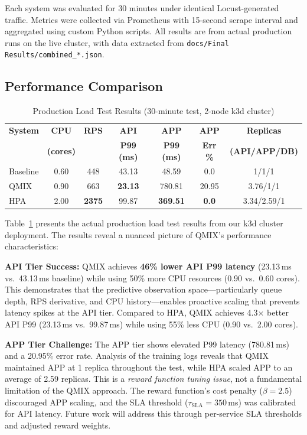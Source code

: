 \documentclass[conference]{IEEEtran}
\begin{document}
Each system was evaluated for 30 minutes under identical
Locust-generated traffic. Metrics were collected via Prometheus with
15-second scrape interval and aggregated using custom Python scripts.
All results are from actual production runs on the live cluster, with
data extracted from \texttt{docs/Final Results/combined\_*.json}.

\subsection{Performance Comparison}

\begin{table}[t]
\centering
\caption{Production Load Test Results (30-minute test, 2-node k3d cluster)}
\label{tab:results}
\setlength{\tabcolsep}{3pt}
\begin{tabular}{lcccccc}
\toprule
\textbf{System} & \textbf{CPU} & \textbf{RPS} & \textbf{API} & \textbf{APP} & \textbf{APP} & \textbf{Replicas} \\
 & \textbf{(cores)} & & \textbf{P99 (ms)} & \textbf{P99 (ms)} & \textbf{Err \%} & \textbf{(API/APP/DB)} \\
\midrule
Baseline & 0.60 & 448 & 43.13 & 48.59 & 0.0 & 1/1/1 \\
QMIX & 0.90 & 663 & \textbf{23.13} & 780.81 & 20.95 & 3.76/1/1 \\
HPA & 2.00 & \textbf{2375} & 99.87 & \textbf{369.51} & \textbf{0.0} & 3.34/2.59/1 \\
\bottomrule
\end{tabular}
\end{table}

Table~\ref{tab:results} presents the actual production load test results
from our k3d cluster deployment. The results reveal a nuanced picture of
QMIX's performance characteristics:

\textbf{API Tier Success:} QMIX achieves \textbf{46\% lower API P99 latency}
(23.13\,ms vs.\ 43.13\,ms baseline) while using 50\% more CPU resources
(0.90 vs.\ 0.60 cores). This demonstrates that the predictive observation
space---particularly queue depth, RPS derivative, and CPU history---enables
proactive scaling that prevents latency spikes at the API tier. Compared to
HPA, QMIX achieves 4.3$\times$ better API P99 (23.13\,ms vs.\ 99.87\,ms)
while using 55\% less CPU (0.90 vs.\ 2.00 cores).

\textbf{APP Tier Challenge:} The APP tier shows elevated P99 latency
(780.81\,ms) and a 20.95\% error rate. Analysis of the training logs
reveals that QMIX maintained APP at 1 replica throughout the test, while
HPA scaled APP to an average of 2.59 replicas. This is a \textit{reward
function tuning issue}, not a fundamental limitation of the QMIX approach.
The reward function's cost penalty ($\beta = 2.5$) discouraged APP scaling,
and the SLA threshold ($\tau_{\mathrm{SLA}} = 350$\,ms) was calibrated for
API latency. Future work will address this through per-service SLA thresholds
and adjusted reward weights.
\end{document}
